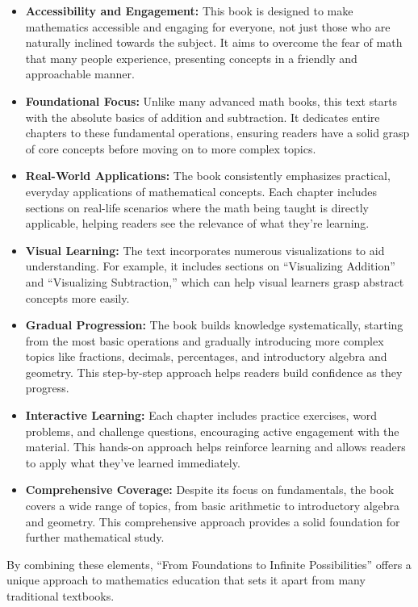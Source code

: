 \begin{itemize}
    \item \textbf{Accessibility and Engagement:} This book is designed to make mathematics accessible and engaging for everyone, not just those who are naturally inclined towards the subject. It aims to overcome the fear of math that many people experience, presenting concepts in a friendly and approachable manner.

    \item \textbf{Foundational Focus:} Unlike many advanced math books, this text starts with the absolute basics of addition and subtraction. It dedicates entire chapters to these fundamental operations, ensuring readers have a solid grasp of core concepts before moving on to more complex topics.

    \item \textbf{Real-World Applications:} The book consistently emphasizes practical, everyday applications of mathematical concepts. Each chapter includes sections on real-life scenarios where the math being taught is directly applicable, helping readers see the relevance of what they're learning.

    \item \textbf{Visual Learning:} The text incorporates numerous visualizations to aid understanding. For example, it includes sections on ``Visualizing Addition'' and ``Visualizing Subtraction,'' which can help visual learners grasp abstract concepts more easily.

    \item \textbf{Gradual Progression:} The book builds knowledge systematically, starting from the most basic operations and gradually introducing more complex topics like fractions, decimals, percentages, and introductory algebra and geometry. This step-by-step approach helps readers build confidence as they progress.

    \item \textbf{Interactive Learning:} Each chapter includes practice exercises, word problems, and challenge questions, encouraging active engagement with the material. This hands-on approach helps reinforce learning and allows readers to apply what they've learned immediately.

    \item \textbf{Comprehensive Coverage:} Despite its focus on fundamentals, the book covers a wide range of topics, from basic arithmetic to introductory algebra and geometry. This comprehensive approach provides a solid foundation for further mathematical study.
\end{itemize}

By combining these elements, ``From Foundations to Infinite Possibilities'' offers a unique approach to mathematics education that sets it apart from many traditional textbooks.